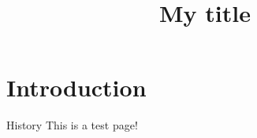 \documentclass{beamer}
\title[...]{My title}
\begin{document}
    \begin{frame}[plain]
        \titlepage
    \end{frame}

    \section{Introduction}

    \begin{frame}{History}
        This is a test page!
    \end{frame}
\end{document}
